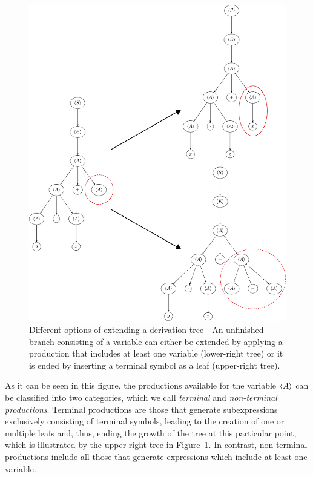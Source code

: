 \begin{figure}
	\centering
	\includegraphics[scale=0.4]{figures/trees/gp_grow_tree_options.pdf}
	\caption{Different options of extending a derivation tree - An unfinished branch consisting of a variable can either be extended by applying a production that includes at least one variable (lower-right tree) or it is ended by inserting a terminal symbol as a leaf (upper-right tree).}
	\label{fig:gp-tree-growing-options}
\end{figure}
As it can be seen in this figure, the productions available for the variable $\langle A \rangle$ can be classified into two categories, which we call \emph{terminal} and \emph{non-terminal productions}.
Terminal productions are those that generate subexpressions exclusively consisting of terminal symbols, leading to the creation of one or multiple leafs and, thus, ending the growth of the tree at this particular point, which is illustrated by the upper-right tree in Figure~\ref{fig:gp-tree-growing-options}.
In contrast, non-terminal productions include all those that generate expressions which include at least one variable.
